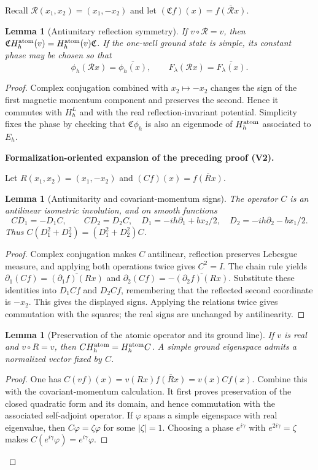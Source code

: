 \documentclass[11pt]{article}
\newtheorem{lemma}[theorem]{Lemma}
\newcommand{\formalisationparentid}{X}
\newenvironment{formalisationaddition}[1]{\par\medskip\begingroup\color{blue}\def\formalisationparentid{#1}\setcounter{formalizationsublemma}{0}\let\lemma\formalizationsublemma\let\endlemma\endformalizationsublemma
  \def\Eo{\mathcal E_h^\circ}\def\EE{\mathcal E_h}\def\phio{\phi_h^\circ}\def\phih{\phi_h}\def\Ho{H_h^{\rm atom}(v^\circ)}\def\Ha{H_h^{\rm atom}}\def\HL{H_h^{L}}\def\Dh{D_h}\def\Log{\operatorname{Log}}\def\ellh{\ell_h}\def\Gp{G_{p,h}}\def\Ast{A_{*,h}}\def\ahat{\widehat{\mathfrak a}_h}\def\ah{\mathfrak a_h}\def\rh{\widehat\rho_h}\def\deltah{\widehat\delta_h}\def\oldref##1{\textup{(##1)}}\def\interface##1{\par\noindent\textit{Analytical interface used here.} ##1\par}\def\finish{\par\noindent\textit{Conclusion of the formalization-oriented expansion.} }\par\noindent\textbf{Formalization-oriented expansion of the preceding proof (V2).}\par\smallskip
}{\par\endgroup\medskip
}
\newcommand{\cR}{\mathcal R}
\begin{document}
Recall $\cR(x_1,x_2)=(x_1,-x_2)$ and let $(\mathfrak C f)(x)=\overline{f(\cR x)}$.
\begin{lemma}[Antiunitary reflection symmetry]\label{lem:antiunitary-master}
If $v\circ\cR=v$, then $\mathfrak C H_h^{\rm atom}(v)=H_h^{\rm atom}(v)\mathfrak C$.  If the one-well ground state is simple, its constant phase may be chosen so that
\[
 \phi_h(\cR x)=\overline{\phi_h(x)},\qquad F_\lambda(\cR x)=\overline{F_\lambda(x)}.
\]
\end{lemma}
\begin{proof}
Complex conjugation combined with $x_2\mapsto-x_2$ changes the sign of the first magnetic momentum component and preserves the second.  Hence it commutes with $H_h^L$ and with the real reflection-invariant potential.  Simplicity fixes the phase by checking that $\mathfrak C\phi_{h}$ is also an eigenmode of $H_h^{\rm atom}$ associated to $E_{h}$.

\begin{formalisationaddition}{L5.2}
Let $R(x_1,x_2)=(x_1,-x_2)$ and $(Cf)(x)=\overline{f(Rx)}$.

\begin{lemma}[Antiunitarity and covariant-momentum signs]\label{sublemma:L5-2-antiunitary-calculus}
The operator $C$ is an antilinear isometric involution, and on smooth functions
\[
 C D_1=-D_1C,\qquad CD_2=D_2C,
 \quad D_1=-ih\partial_1+bx_2/2,\quad D_2=-ih\partial_2-bx_1/2.
\]
Thus $C(D_1^2+D_2^2)=(D_1^2+D_2^2)C$.
\end{lemma}
\begin{proof}
Complex conjugation makes $C$ antilinear, reflection preserves Lebesgue measure, and applying both operations twice gives $C^2=I$. The chain rule yields
$\partial_1(Cf)=\overline{(\partial_1f)(Rx)}$ and
$\partial_2(Cf)=-\overline{(\partial_2f)(Rx)}$.
Substitute these identities into $D_1Cf$ and $D_2Cf$, remembering that the reflected second coordinate is $-x_2$. This gives the displayed signs. Applying the relations twice gives commutation with the squares; the real signs are unchanged by antilinearity.
\end{proof}

\begin{lemma}[Preservation of the atomic operator and its ground line]\label{sublemma:L5-2-ground-line}
If $v$ is real and $v\circ R=v$, then $C\Ha=\Ha C$. A simple ground eigenspace admits a normalized vector fixed by $C$.
\end{lemma}
\begin{proof}
One has $C(vf)(x)=v(Rx)\overline{f(Rx)}=v(x)Cf(x)$. Combine this with the covariant-momentum calculation. It first proves preservation of the closed quadratic form and its domain, and hence commutation with the associated self-adjoint operator. If $\varphi$ spans a simple eigenspace with real eigenvalue, then $C\varphi=\zeta\varphi$ for some $|\zeta|=1$. Choosing a phase $e^{i\gamma}$ with $e^{2i\gamma}=\zeta$ makes $C(e^{i\gamma}\varphi)=e^{i\gamma}\varphi$.
\end{proof}


\end{formalisationaddition}
\end{proof}
\end{document}
